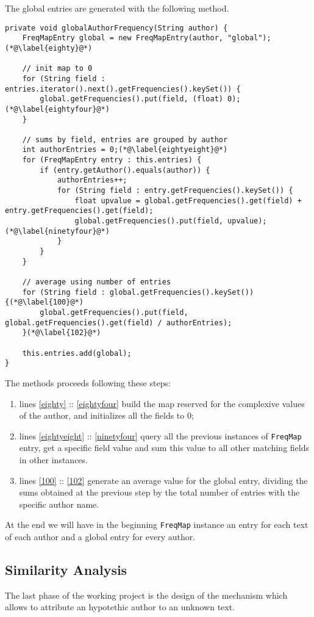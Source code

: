 \documentclass[a4paper,11pt, twoside]{article}
\begin{document}
	 \bigskip
	 \noindent
	 The global entries are generated with the following method.
	 \begin{lstlisting}[firstnumber=79, caption={globalAuthorFrequency method}, captionpos=b]
private void globalAuthorFrequency(String author) {
	FreqMapEntry global = new FreqMapEntry(author, "global");(*@\label{eighty}@*)
	
	// init map to 0
	for (String field : entries.iterator().next().getFrequencies().keySet()) {
		global.getFrequencies().put(field, (float) 0);(*@\label{eightyfour}@*)
	}
	
	// sums by field, entries are grouped by author
	int authorEntries = 0;(*@\label{eightyeight}@*)
	for (FreqMapEntry entry : this.entries) {
		if (entry.getAuthor().equals(author)) {
			authorEntries++;
			for (String field : entry.getFrequencies().keySet()) {
				float upvalue = global.getFrequencies().get(field) + entry.getFrequencies().get(field);
				global.getFrequencies().put(field, upvalue);(*@\label{ninetyfour}@*)
			}
		}
	}
	
	// average using number of entries
	for (String field : global.getFrequencies().keySet()) {(*@\label{100}@*)
		global.getFrequencies().put(field, global.getFrequencies().get(field) / authorEntries);
	}(*@\label{102}@*)
	
	this.entries.add(global);
}
	 \end{lstlisting}
	 
	 The methods proceeds following these steps: \begin{enumerate}
	 	\item lines \ref{eighty} :: \ref{eightyfour} build the map reserved for the complexive values of the author, and initializes all the fields to 0;
	 	\item lines \ref{eightyeight} :: \ref{ninetyfour} query all the previous instances of \lstinline|FreqMap| entry, get a specific field value and sum this value to all other matching fields in other instances.
	 	\item lines \ref{100} :: \ref{102} generate an average value for the global entry, dividing the sums obtained at the previous step by the total number of entries with the specific author name.
	 \end{enumerate}
	 
	 \bigskip
	 \noindent
	 At the end we will have in the beginning \lstinline|FreqMap| instance an entry for each text of each author and a global entry for every author.
	
	\subsection{Similarity Analysis}
	The last phase of the working project is the design of the mechanism which allows to attribute an hypotethic author to an unknown text.
	
\end{document}
